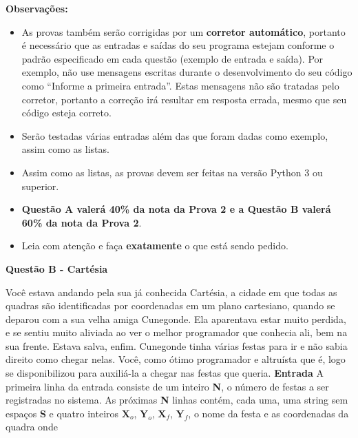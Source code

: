 \documentclass[a4paper, 12pt]{article}
\begin{document}
\textbf{{\large Observações:}}
\begin{itemize}
	\item As provas também serão corrigidas por um \textbf{corretor automático}, portanto é necessário que as entradas e saídas do seu programa estejam conforme o padrão especificado em cada questão (exemplo de entrada e saída). Por exemplo, não use mensagens escritas durante o desenvolvimento do seu código como “Informe a primeira entrada”. Estas mensagens não são tratadas pelo corretor, portanto a correção irá resultar em resposta errada, mesmo que seu código esteja correto.
	\item Serão testadas várias entradas além das que foram dadas como exemplo, assim como as listas.
	\item Assim como as listas, as provas devem ser feitas na versão Python 3 ou superior.
	\item \textbf{Questão A valerá 40\% da nota da Prova 2 e a Questão B valerá 60\% da nota da Prova 2}.
	\item Leia com atenção e faça \textbf{exatamente} o que está sendo pedido.
\end{itemize}
\newpage %
\begin{center}
\textbf{{\Large Questão B - Cartésia}}
\end{center}
\vspace{5pt}
Você estava andando pela sua já conhecida Cartésia, a cidade em que todas as
quadras são identificadas por coordenadas em um plano cartesiano, quando se
deparou com a sua velha amiga Cunegonde. \newline
Ela aparentava estar muito perdida, e se sentiu muito aliviada ao ver o melhor
programador que conhecia ali, bem na sua frente. Estava salva, enfim. \newline \newline
Cunegonde tinha várias festas para ir e não sabia direito como chegar nelas. Você,
como ótimo programador e altruísta que é, logo se disponibilizou para auxiliá-la a
chegar nas festas que queria. \newline \newline
\textbf{{\large Entrada}} \newline
A primeira linha da entrada consiste de um inteiro \textbf{N}, o número de festas a ser
registradas no sistema. \newline
As próximas \textbf{N} linhas contém, cada uma, uma string sem espaços \textbf{S} e quatro
inteiros $\textbf{X}_o$, $\textbf{Y}_o$, $\textbf{X}_f$, $\textbf{Y}_f$, o nome da festa e as coordenadas da quadra onde
\end{document}
